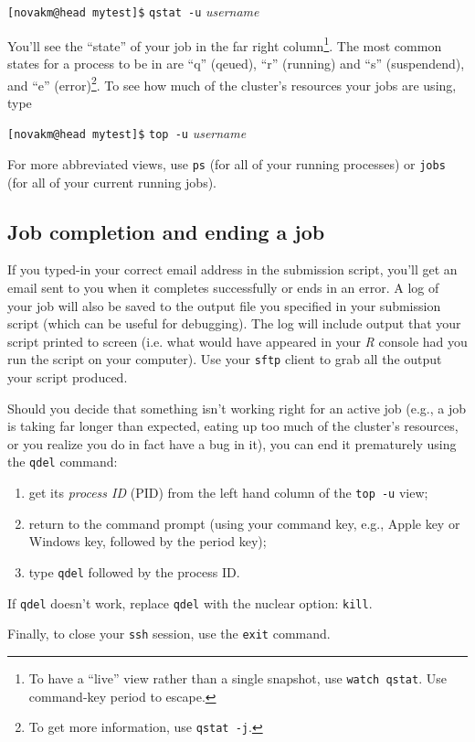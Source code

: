 \documentclass[12pt,letterpaper]{article}
\begin{document}
\texttt{[novakm@head mytest]\$} \texttt{qstat -u} \emph{username}

\noindent
You'll see the ``state'' of your job in the far right column\footnote{To have a ``live'' view rather than a single snapshot, use \texttt{watch qstat}.  Use command-key period to escape.}.
The most common states for a process to be in are ``q'' (qeued), ``r'' (running) and ``s'' (suspendend), and ``e'' (error)\footnote{To get more information, use \texttt{qstat -j}.}.
To see how much of the cluster's resources your jobs are using, type

\texttt{[novakm@head mytest]\$} \texttt{top -u} \emph{username}

\noindent
For more abbreviated views, use \texttt{ps} (for all of your running processes) or \texttt{jobs} (for all of your current running jobs).


\subsection{Job completion and ending a job}
If you typed-in your correct email address in the submission script, you'll get an email sent to you when it completes successfully or ends in an error.
A log of your job will also be saved to the output file you specified in your submission script (which can be useful for debugging).
The log will include output that your script printed to screen (i.e. what would have appeared in your \emph{R} console had you run the script on your computer).
Use your \texttt{sftp} client to grab all the output your script produced.


Should you decide that something isn't working right for an active job (e.g., a job is taking far longer than expected, eating up too much of the cluster's resources, or you realize you do in fact have a bug in it), you can end it prematurely using the \texttt{qdel} command:
\begin{enumerate}
	\item get its \emph{process ID} (PID) from the left hand column of the \texttt{top -u} view;
	\item return to the command prompt (using your command key, e.g., Apple key or Windows key, followed by the period key);
	\item type \texttt{qdel} followed by the process ID.
\end{enumerate}
If \texttt{qdel} doesn't work, replace \texttt{qdel} with the nuclear option:  \texttt{kill}.


Finally, to close your \texttt{ssh} session, use the \texttt{exit} command.
\end{document}
